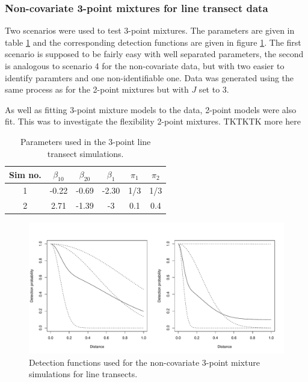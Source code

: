 \subsubsection{Non-covariate 3-point mixtures for line transect data}

Two scenarios were used to test 3-point mixtures. The parameters are given in table \ref{mmds-3pt-simtable} and the corresponding detection functions are given in figure \ref{mmds-3pt-funcs}. The first scenario is supposed to be fairly easy with well separated parameters, the second is analogous to scenario 4 for the non-covariate data, but with two easier to identify paramters and one non-identifiable one. Data was generated using the same process as for the 2-point mixtures but with $J$ set to $3$.

As well as fitting 3-point mixture models to the data, 2-point models were also fit. This was to investigate the flexibility 2-point mixtures. TKTKTK more here

\begin{table}[h]
\centering
\begin{tabular}{c c c c c c}
Sim no. & $\beta_{10}$ & $\beta_{20}$ & $\beta_1$ & $\pi_1$ & $\pi_2$\\
\hline
\hline
1 & -0.22 & -0.69 & -2.30 & 1/3 & 1/3 \\ 
2 &  2.71 & -1.39 & -3 & 0.1 & 0.4 \\
\end{tabular}
\label{mmds-3pt-simtable}
\caption{Parameters used in the 3-point line transect simulations.}
\end{table}

\begin{figure}
\centering
\includegraphics[width=6in]{mix/figs/3pt-detfcts.pdf}
\caption{Detection functions used for the non-covariate 3-point mixture simulations for line transects.}
\label{mmds-3pt-funcs}
\end{figure}

